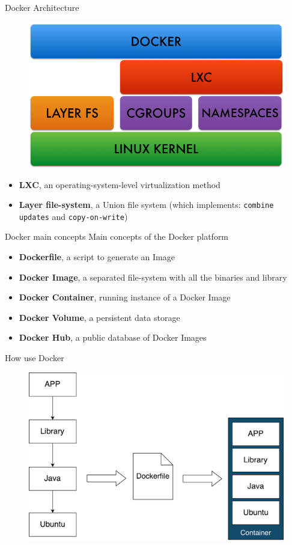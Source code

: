 \documentclass{beamer}
\begin{document}
  \begin{frame}{Docker Architecture}
    \begin{figure}
      \includegraphics[width=.7\textwidth]{img/docker_achitecture_crop.png}
    \end{figure}
    \begin{itemize}
      \item \textbf{LXC}, an operating-system-level virtualization method
      \item \textbf{Layer file-system}, a Union file system (which implements: \texttt{combine updates} and \texttt{copy-on-write})
    \end{itemize}
  \end{frame}

  \begin{frame}{Docker main concepts}
    Main concepts of the Docker platform
    \begin{itemize}
      \item \textbf{Dockerfile}, a script to generate an Image
      \item \textbf{Docker Image}, a separated file-system with all the binaries and library
      \item \textbf{Docker Container}, running instance of a Docker Image
      \item \textbf{Docker Volume}, a persistent data storage
      \item \textbf{Docker Hub}, a public database of Docker Images
    \end{itemize}
  \end{frame}

  \begin{frame}{How use Docker}
    \begin{figure}
      \includegraphics[width=1\textwidth]{img/docker_build.pdf}
    \end{figure}
  \end{frame}
\end{document}
